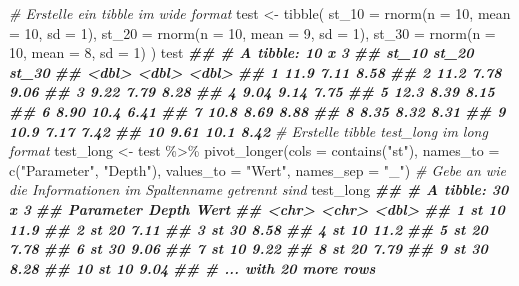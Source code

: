\documentclass[
]{article}
\newenvironment{Shaded}{\begin{snugshade}}{\end{snugshade}}
\newcommand{\AttributeTok}[1]{\textcolor[rgb]{0.77,0.63,0.00}{#1}}
\newcommand{\CommentTok}[1]{\textcolor[rgb]{0.56,0.35,0.01}{\textit{#1}}}
\newcommand{\DecValTok}[1]{\textcolor[rgb]{0.00,0.00,0.81}{#1}}
\newcommand{\DocumentationTok}[1]{\textcolor[rgb]{0.56,0.35,0.01}{\textbf{\textit{#1}}}}
\newcommand{\FunctionTok}[1]{\textcolor[rgb]{0.00,0.00,0.00}{#1}}
\newcommand{\NormalTok}[1]{#1}
\newcommand{\OtherTok}[1]{\textcolor[rgb]{0.56,0.35,0.01}{#1}}
\newcommand{\SpecialCharTok}[1]{\textcolor[rgb]{0.00,0.00,0.00}{#1}}
\newcommand{\StringTok}[1]{\textcolor[rgb]{0.31,0.60,0.02}{#1}}
\begin{document}
\begin{Shaded}
\begin{Highlighting}[]
\CommentTok{\# Erstelle ein tibble im wide format}
\NormalTok{test }\OtherTok{\textless{}{-}} \FunctionTok{tibble}\NormalTok{(}
  \AttributeTok{st\_10 =} \FunctionTok{rnorm}\NormalTok{(}\AttributeTok{n =} \DecValTok{10}\NormalTok{, }\AttributeTok{mean =} \DecValTok{10}\NormalTok{, }\AttributeTok{sd =} \DecValTok{1}\NormalTok{), }
  \AttributeTok{st\_20 =} \FunctionTok{rnorm}\NormalTok{(}\AttributeTok{n =} \DecValTok{10}\NormalTok{, }\AttributeTok{mean =} \DecValTok{9}\NormalTok{, }\AttributeTok{sd =} \DecValTok{1}\NormalTok{), }
  \AttributeTok{st\_30 =} \FunctionTok{rnorm}\NormalTok{(}\AttributeTok{n =} \DecValTok{10}\NormalTok{, }\AttributeTok{mean =} \DecValTok{8}\NormalTok{, }\AttributeTok{sd =} \DecValTok{1}\NormalTok{) }
\NormalTok{)}
\NormalTok{test}
\DocumentationTok{\#\# \# A tibble: 10 x 3}
\DocumentationTok{\#\#    st\_10 st\_20 st\_30}
\DocumentationTok{\#\#    \textless{}dbl\textgreater{} \textless{}dbl\textgreater{} \textless{}dbl\textgreater{}}
\DocumentationTok{\#\#  1 11.9   7.11  8.58}
\DocumentationTok{\#\#  2 11.2   7.78  9.06}
\DocumentationTok{\#\#  3  9.22  7.79  8.28}
\DocumentationTok{\#\#  4  9.04  9.14  7.75}
\DocumentationTok{\#\#  5 12.3   8.39  8.15}
\DocumentationTok{\#\#  6  8.90 10.4   6.41}
\DocumentationTok{\#\#  7 10.8   8.69  8.88}
\DocumentationTok{\#\#  8  8.35  8.32  8.31}
\DocumentationTok{\#\#  9 10.9   7.17  7.42}
\DocumentationTok{\#\# 10  9.61 10.1   8.42}
\CommentTok{\# Erstelle tibble test\_long im long format}
\NormalTok{test\_long }\OtherTok{\textless{}{-}}\NormalTok{ test }\SpecialCharTok{\%\textgreater{}\%}
  \FunctionTok{pivot\_longer}\NormalTok{(}\AttributeTok{cols =} \FunctionTok{contains}\NormalTok{(}\StringTok{"st"}\NormalTok{), }\AttributeTok{names\_to =} \FunctionTok{c}\NormalTok{(}\StringTok{"Parameter"}\NormalTok{, }\StringTok{"Depth"}\NormalTok{), }\AttributeTok{values\_to =} \StringTok{"Wert"}\NormalTok{, }\AttributeTok{names\_sep =} \StringTok{"\_"}\NormalTok{) }\CommentTok{\# Gebe an wie die Informationen im Spaltenname getrennt sind}
\NormalTok{test\_long}
\DocumentationTok{\#\# \# A tibble: 30 x 3}
\DocumentationTok{\#\#    Parameter Depth  Wert}
\DocumentationTok{\#\#    \textless{}chr\textgreater{}     \textless{}chr\textgreater{} \textless{}dbl\textgreater{}}
\DocumentationTok{\#\#  1 st        10    11.9 }
\DocumentationTok{\#\#  2 st        20     7.11}
\DocumentationTok{\#\#  3 st        30     8.58}
\DocumentationTok{\#\#  4 st        10    11.2 }
\DocumentationTok{\#\#  5 st        20     7.78}
\DocumentationTok{\#\#  6 st        30     9.06}
\DocumentationTok{\#\#  7 st        10     9.22}
\DocumentationTok{\#\#  8 st        20     7.79}
\DocumentationTok{\#\#  9 st        30     8.28}
\DocumentationTok{\#\# 10 st        10     9.04}
\DocumentationTok{\#\# \# ... with 20 more rows}
\end{Highlighting}
\end{Shaded}
\end{document}
